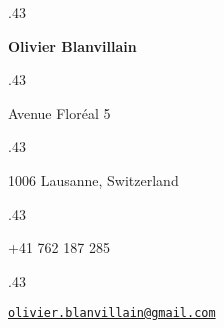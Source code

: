 \documentclass[margin, a4paper]{res}
\newcommand{\centered}[1]{\moveleft.43\hoffset\centerline{#1}}
\begin{document}
\centered{\LARGE\textbf{Olivier Blanvillain}}
\vspace{3pt}

\centered{Avenue Floréal 5}
\centered{1006 Lausanne, Switzerland}
\vspace{3pt}
\centered{+41 762 187 285}
\vspace{3pt}
\centered{\href{mailto:olivier.blanvillain@gmail.com}{\texttt{olivier.blanvillain@gmail.com}}}

\begin{resume}
  
\end{resume}
\end{document}
